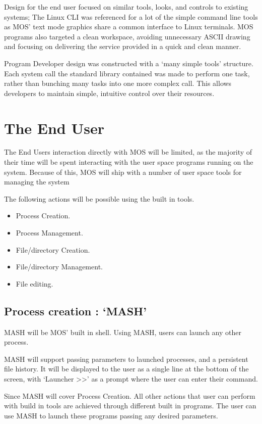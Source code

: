 \documentclass[a4paper]{report}
\begin{document}
Design for the end user focused on similar tools, looks, and controls to existing systems; The Linux CLI was referenced for a lot of the simple command line tools as MOS' text mode graphics share a common interface to Linux terminals. MOS programs also targeted a clean workspace, avoiding unnecessary ASCII drawing and focusing on delivering the service provided in a quick and clean manner.

Program Developer design was constructed with a `many simple tools' structure. Each system call the standard library contained was made to perform one task, rather than bunching many tasks into one more complex call. This allows developers to maintain simple, intuitive control over their resources.


\clearpage
\section{The End User}

The End Users interaction directly with MOS will be limited, as the majority of their time will be spent interacting with the user space programs running on the system. Because of this, MOS will ship with a number of user space tools for managing the system

The following actions will be possible using the built in tools.
\begin{itemize}
\item Process Creation.
\item Process Management.
\item File/directory Creation.
\item File/directory Management.
\item File editing.
\end{itemize}

\subsection {Process creation : `MASH'}

MASH will be MOS' built in shell. Using MASH, users can launch any other process.

MASH will support passing parameters to launched processes, and a persistent file history. It will be displayed to the user as a single line at the bottom of the screen, with `Launcher \textgreater \textgreater ' as a prompt where the user can enter their command.

Since MASH will cover Process Creation. All other actions that user can perform with build in tools are achieved through different built in programs. The user can use MASH to launch these programs passing any desired parameters.
\end{document}
